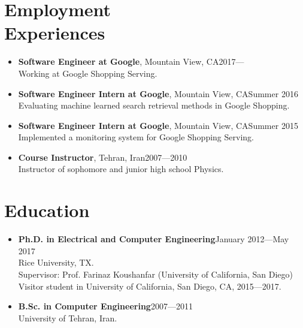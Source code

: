 \documentclass[overlapped]{res}
\begin{document}

\address{
 \href{mailto:esonghori@google.com}{esonghori(at)google.com}\\
 \href{mailto:e.songhori@gmail.com }{e.songhori(at)gmail.com}\\
 \href{https://esonghori.github.io}{esonghori.github.io}
}

\begin{resume}

\section{Employment\\ Experiences}
\begin{itemize}
\item {\bf Software Engineer at Google}, Mountain View, CA\hfill 2017---\\
Working at Google Shopping Serving.
\item {\bf Software Engineer Intern at Google}, Mountain View, CA\hfill Summer 2016\\
Evaluating machine learned search retrieval methods in Google Shopping.
\item {\bf Software Engineer Intern at Google}, Mountain View, CA\hfill Summer 2015\\
Implemented a monitoring system for Google Shopping Serving.
\item {\bf Course Instructor}, Tehran, Iran\hfill 2007---2010 \\
Instructor of sophomore and junior high school Physics.
\end{itemize}

\section{Education}
\begin{itemize}
\item {\bf Ph.D. in Electrical and Computer Engineering}\hfill January 2012---May 2017\\
Rice University, TX.\\
Supervisor: Prof. Farinaz Koushanfar (University of California, San Diego)\\
Visitor student in University of California, San Diego, CA, 2015---2017.\\
\item {\bf B.Sc. in Computer Engineering}\hfill 2007---2011\\
University of Tehran, Iran.\\
\end{itemize}



\end{resume}
\end{document}

